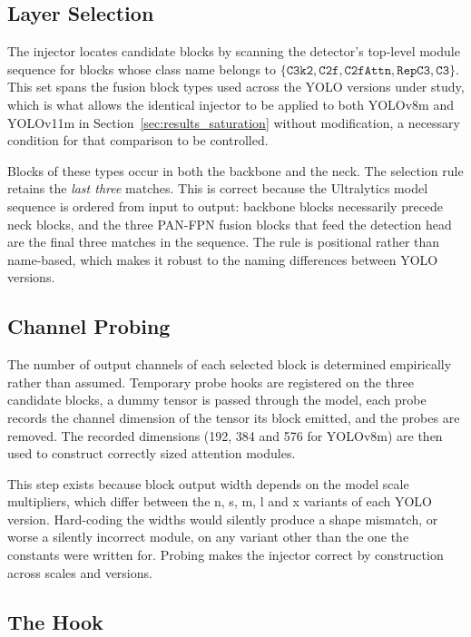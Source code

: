 \documentclass[MScCS]{uccthesis}
\begin{document}
\subsection{Layer Selection}

The injector locates candidate blocks by scanning the detector's top-level
module sequence for blocks whose class name belongs to
$\{\texttt{C3k2}, \texttt{C2f}, \texttt{C2fAttn}, \texttt{RepC3}, \texttt{C3}\}$.
This set spans the fusion block types used across the YOLO versions under
study, which is what allows the identical injector to be applied to both
YOLOv8m and YOLOv11m in Section~\ref{sec:results_saturation} without
modification, a necessary condition for that comparison to be controlled.

Blocks of these types occur in both the backbone and the neck. The selection
rule retains the \emph{last three} matches. This is correct because the
Ultralytics model sequence is ordered from input to output: backbone blocks
necessarily precede neck blocks, and the three PAN-FPN fusion blocks that feed
the detection head are the final three matches in the sequence. The rule is
positional rather than name-based, which makes it robust to the naming
differences between YOLO versions.

\subsection{Channel Probing}

The number of output channels of each selected block is determined empirically
rather than assumed. Temporary probe hooks are registered on the three
candidate blocks, a dummy tensor is passed through the model, each probe
records the channel dimension of the tensor its block emitted, and the probes
are removed. The recorded dimensions (192, 384 and 576 for YOLOv8m) are
then used to construct correctly sized attention modules.

This step exists because block output width depends on the model scale
multipliers, which differ between the n, s, m, l and x variants of each YOLO
version. Hard-coding the widths would silently produce a shape mismatch, or
worse a silently incorrect module, on any variant other than the one the
constants were written for. Probing makes the injector correct by construction
across scales and versions.

\subsection{The Hook}
\end{document}
